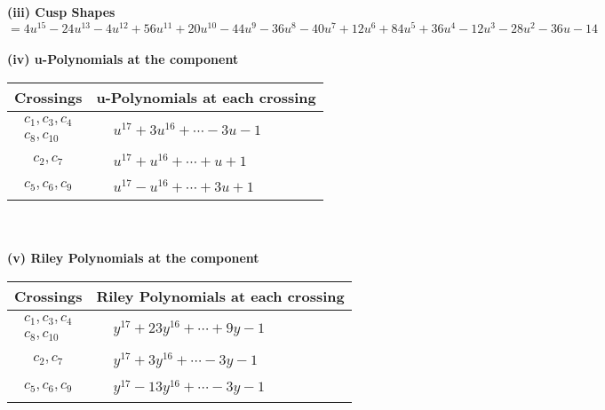 \documentclass[1p]{elsarticle_modified}
\theoremstyle{definition}
\begin{document}
\flushleft \textbf{(iii) Cusp Shapes $= 4 u^{15}-24 u^{13}-4 u^{12}+56 u^{11}+20 u^{10}-44 u^9-36 u^8-40 u^7+12 u^6+84 u^5+36 u^4-12 u^3-28 u^2-36 u-14$}\\~\\
\newpage\renewcommand{\arraystretch}{1}
\flushleft \textbf{(iv) u-Polynomials at the component}\newline \\
\begin{tabular}{m{50pt}|m{274pt}}
Crossings & \hspace{64pt}u-Polynomials at each crossing \\
\hline $$\begin{aligned}c_{1},c_{3},c_{4}\\c_{8},c_{10}\end{aligned}$$&$\begin{aligned}
&u^{17}+3 u^{16}+\cdots-3 u-1
\end{aligned}$\\
\hline $$\begin{aligned}c_{2},c_{7}\end{aligned}$$&$\begin{aligned}
&u^{17}+u^{16}+\cdots+u+1
\end{aligned}$\\
\hline $$\begin{aligned}c_{5},c_{6},c_{9}\end{aligned}$$&$\begin{aligned}
&u^{17}- u^{16}+\cdots+3 u+1
\end{aligned}$\\
\hline
\end{tabular}\\~\\
\newpage\renewcommand{\arraystretch}{1}
\flushleft \textbf{(v) Riley Polynomials at the component}\newline \\
\begin{tabular}{m{50pt}|m{274pt}}
Crossings & \hspace{64pt}Riley Polynomials at each crossing \\
\hline $$\begin{aligned}c_{1},c_{3},c_{4}\\c_{8},c_{10}\end{aligned}$$&$\begin{aligned}
&y^{17}+23 y^{16}+\cdots+9 y-1
\end{aligned}$\\
\hline $$\begin{aligned}c_{2},c_{7}\end{aligned}$$&$\begin{aligned}
&y^{17}+3 y^{16}+\cdots-3 y-1
\end{aligned}$\\
\hline $$\begin{aligned}c_{5},c_{6},c_{9}\end{aligned}$$&$\begin{aligned}
&y^{17}-13 y^{16}+\cdots-3 y-1
\end{aligned}$\\
\hline
\end{tabular}\\~\\
\end{document}
